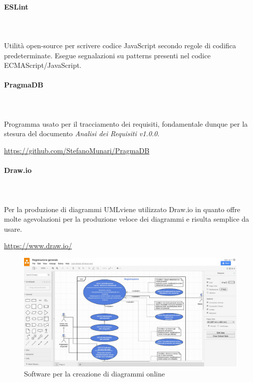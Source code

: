 \paragraph{ESLint} \mbox{}\\ \mbox{}\\
Utilità open-source per scrivere codice JavaScript secondo regole di codifica 
predeterminate. Esegue segnalazioni su patterns presenti nel codice 
ECMAScript/JavaScript.
		
\paragraph{PragmaDB} \mbox{}\\ \mbox{}\\
Programma usato per il tracciamento dei requisiti, fondamentale dunque per la 
stesura del documento \textit{Analisi dei Requisiti v1.0.0}. \newline
\centerline{\url{https://github.com/StefanoMunari/PragmaDB}}
		
\paragraph{Draw.io} \mbox{}\\ \mbox{}\\
Per la produzione di diagrammi UML\glosp viene utilizzato Draw.io in quanto 
offre molte agevolazioni per la produzione veloce dei diagrammi e risulta 
semplice da usare. \newline
\centerline{\url{https://www.draw.io/}}
	\begin{figure}[H]
		\includegraphics[width=0.99\linewidth]{res/images/drawio.jpg}
		\caption{Software per la creazione di diagrammi online}
	\end{figure} 
		
